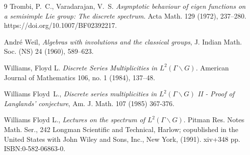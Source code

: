 \documentclass[11 pt]{amsart}
\theoremstyle{definition}
\numberwithin{equation}{section}
\begin{document}
\begin{thebibliography}{9}
Trombi, P.~C., Varadarajan, V.~S. \textit{Asymptotic behaviour of eigen functions on a semisimple Lie group: The discrete spectrum}. Acta Math. 129 (1972), 237–280. https://doi.org/10.1007/BF02392217.

André Weil, \textit{Algebras with involutions and the classical groups}, J. Indian Math. Soc. (NS) 24 (1960), 589–623.

Williams, Floyd L. \textit{Discrete Series Multiplicities in $L^2(\Gamma\backslash G)$.} American Journal of Mathematics 106, no. 1 (1984), 137–48. 

Williams Floyd~L., \textit{Discrete series multiplicities in $L^2(\Gamma \backslash G)$ II - Proof of Langlands' conjecture}, Am. J. Math. 107 (1985) 367-376.

Williams Floyd L., \textit{Lectures on the spectrum of $L^2(\Gamma \backslash G)$}. Pitman Res. Notes Math. Ser., 242
Longman Scientific and Technical, Harlow; copublished in the United States with John Wiley
and Sons, Inc., New York, (1991). xiv+348 pp. ISBN:0-582-06863-0.


\end{thebibliography}
\end{document}
